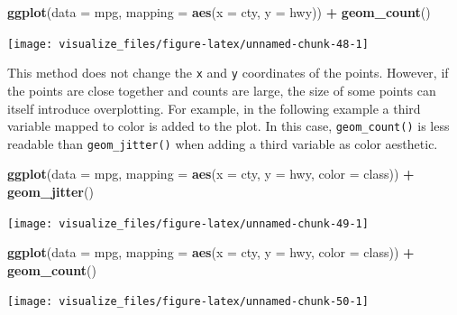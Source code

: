 \documentclass[]{book}
\newenvironment{Shaded}{\begin{snugshade}}{\end{snugshade}}
\newcommand{\DataTypeTok}[1]{\textcolor[rgb]{0.13,0.29,0.53}{#1}}
\newcommand{\KeywordTok}[1]{\textcolor[rgb]{0.13,0.29,0.53}{\textbf{#1}}}
\newcommand{\NormalTok}[1]{#1}
\newcommand{\OperatorTok}[1]{\textcolor[rgb]{0.81,0.36,0.00}{\textbf{#1}}}
\newcommand{\StringTok}[1]{\textcolor[rgb]{0.31,0.60,0.02}{#1}}
\theoremstyle{plain}
\theoremstyle{remark}
\begin{document}
\begin{Shaded}
\begin{Highlighting}[]
\KeywordTok{ggplot}\NormalTok{(}\DataTypeTok{data =}\NormalTok{ mpg, }\DataTypeTok{mapping =} \KeywordTok{aes}\NormalTok{(}\DataTypeTok{x =}\NormalTok{ cty, }\DataTypeTok{y =}\NormalTok{ hwy)) }\OperatorTok{+}
\StringTok{  }\KeywordTok{geom_count}\NormalTok{()}
\end{Highlighting}
\end{Shaded}

\begin{center}\texttt{[image: visualize\_files/figure-latex/unnamed-chunk-48-1]} \end{center}

This method does not change the \texttt{x} and \texttt{y} coordinates of the points.
However, if the points are close together and counts are large, the size of some
points can itself introduce overplotting.
For example, in the following example a third variable mapped to color is added to the plot. In this case, \texttt{geom\_count()} is less readable than \texttt{geom\_jitter()} when adding a third variable as color aesthetic.

\begin{Shaded}
\begin{Highlighting}[]
\KeywordTok{ggplot}\NormalTok{(}\DataTypeTok{data =}\NormalTok{ mpg, }\DataTypeTok{mapping =} \KeywordTok{aes}\NormalTok{(}\DataTypeTok{x =}\NormalTok{ cty, }\DataTypeTok{y =}\NormalTok{ hwy, }\DataTypeTok{color =}\NormalTok{ class)) }\OperatorTok{+}
\StringTok{  }\KeywordTok{geom_jitter}\NormalTok{()}
\end{Highlighting}
\end{Shaded}

\begin{center}\texttt{[image: visualize\_files/figure-latex/unnamed-chunk-49-1]} \end{center}

\begin{Shaded}
\begin{Highlighting}[]
\KeywordTok{ggplot}\NormalTok{(}\DataTypeTok{data =}\NormalTok{ mpg, }\DataTypeTok{mapping =} \KeywordTok{aes}\NormalTok{(}\DataTypeTok{x =}\NormalTok{ cty, }\DataTypeTok{y =}\NormalTok{ hwy, }\DataTypeTok{color =}\NormalTok{ class)) }\OperatorTok{+}
\StringTok{  }\KeywordTok{geom_count}\NormalTok{()}
\end{Highlighting}
\end{Shaded}

\begin{center}\texttt{[image: visualize\_files/figure-latex/unnamed-chunk-50-1]} \end{center}
\end{document}
